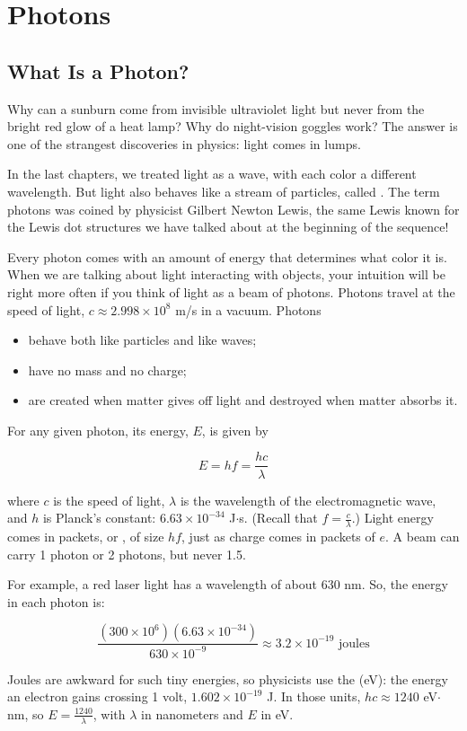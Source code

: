 \chapter{Photons}

\section{What Is a Photon?}

Why can a sunburn come from invisible ultraviolet light but never from
the bright red glow of a heat lamp? Why do night-vision goggles work? The
answer is one of the strangest discoveries in physics: light comes in
lumps.

In the last chapters, we treated light as a wave, with each color a
different wavelength. But light also behaves like a stream of particles,
called . The term photons was coined by physicist Gilbert Newton Lewis, the same Lewis known for the Lewis dot structures we have talked about at the beginning of the sequence!

Every photon comes with an amount of energy that determines what color it is.
When we are talking about light interacting with objects, your
intuition will be right more often if you think of light as a beam of
photons. Photons travel at the speed of light, $c \approx
2.998 \times 10^8$ m/s in a vacuum. Photons
\begin{itemize}
  \item behave both like particles and like waves;
  \item have no mass and no charge;
  \item are created when matter gives off light and destroyed when matter
        absorbs it.
\end{itemize}


\begin{mdframed}[style=important, frametitle={Formula for energy of a photon}]

For any given photon, its energy, $E$, is given by

$$E = hf = \frac{h c}{\lambda}$$

where $c$ is the speed of light, $\lambda$ is the wavelength of the
electromagnetic wave, and $h$ is Planck's constant: $6.63 \times 10^{-34}$ J$\cdot$s. (Recall
that $f = \frac{c}{\lambda}$.) Light energy comes in packets, or
, of size $hf$, just as charge comes in packets of $e$. A
beam can carry 1 photon or 2 photons, but never 1.5.

For example, a red laser light has a wavelength of about 630 nm. So, the energy in each photon is:

$$\frac{(300 \times 10^6) (6.63 \times 10^{-34})}{630 \times 10^{-9}} \approx 3.2 \times 10^{-19} \text{ joules}$$

Joules are awkward for such tiny energies, so physicists use the
 (eV): the energy an electron gains crossing 1 volt,
$1.602 \times 10^{-19}$ J. In those units, $hc \approx 1240$ eV$\cdot$nm,
so $E = \frac{1240}{\lambda}$, with $\lambda$ in nanometers and $E$ in eV.
\end{mdframed}

